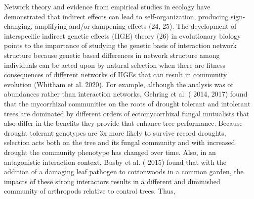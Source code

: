 \documentclass{article}
\begin{document}
Network theory and evidence from empirical studies in ecology have demonstrated that indirect effects can lead to
self-organization, producing sign-changing, amplifying and/or dampening effects (24, 25). The development of
interspecific indirect genetic effects (IIGE) theory (26) in evolutionary biology points to the importance of studying
the genetic basis of interaction network structure because genetic based differences in network structure among
individuals can be acted upon by natural selection when there are fitness consequences of different networks of IIGEs
that can result in community evolution (Whitham et al. %
2020). For example, although the analysis was of abundances rather than interaction networks, Gehring et al. (%
2014, %
%
2017) found that the mycorrhizal communities on the roots of drought tolerant and intolerant trees are dominated by
different orders of ectomycorrhizal fungal mutualists that also differ in the benefits they provide that enhance tree
performance. Because drought tolerant genotypes are 3x more likely to survive record droughts, selection acts both on
the tree and its fungal community and with increased drought the community phenotype has changed over time. Also, in an
antagonistic interaction context, Busby et al. (%
2015) found that with the addition of a damaging leaf pathogen to cottonwoods in a common garden, the impacts of these
strong interactors results in a different and diminished community of arthropods relative to control trees. Thus,
\end{document}
